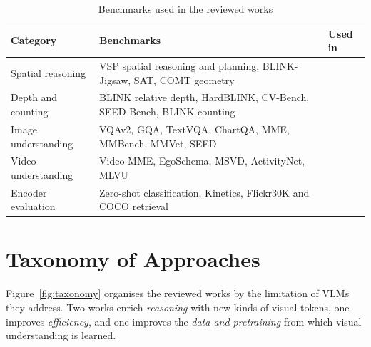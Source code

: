 \documentclass[12pt,a4paper,final]{extreport}
\begin{document}
{\renewcommand{\arraystretch}{1.15}
\begin{table}[htbp]
\centering
\caption{Benchmarks used in the reviewed works}\label{tab:bench}
\small
\begin{tabularx}{\textwidth}{|>{\raggedright\arraybackslash}p{3.0cm}|X|p{1.4cm}|}
\hline
\textbf{Category} & \textbf{Benchmarks} & \textbf{Used in} \\ \hline
Spatial reasoning & VSP spatial reasoning and planning, BLINK-Jigsaw, SAT, COMT geometry & \cite{p1} \\ \hline
Depth and counting & BLINK relative depth, HardBLINK, CV-Bench, SEED-Bench, BLINK counting & \cite{p2} \\ \hline
Image understanding & VQAv2, GQA, TextVQA, ChartQA, MME, MMBench, MMVet, SEED & \cite{p3,p4} \\ \hline
Video understanding & Video-MME, EgoSchema, MSVD, ActivityNet, MLVU & \cite{p3,p4} \\ \hline
Encoder evaluation & Zero-shot classification, Kinetics, Flickr30K and COCO retrieval & \cite{p4} \\ \hline
\end{tabularx}
\end{table}}

\section{Taxonomy of Approaches}

\paragraph{} Figure~\ref{fig:taxonomy} organises the reviewed works by the limitation of VLMs they address. Two works enrich \emph{reasoning} with new kinds of visual tokens, one improves \emph{efficiency}, and one improves the \emph{data and pretraining} from which visual understanding is learned.
\end{document}
